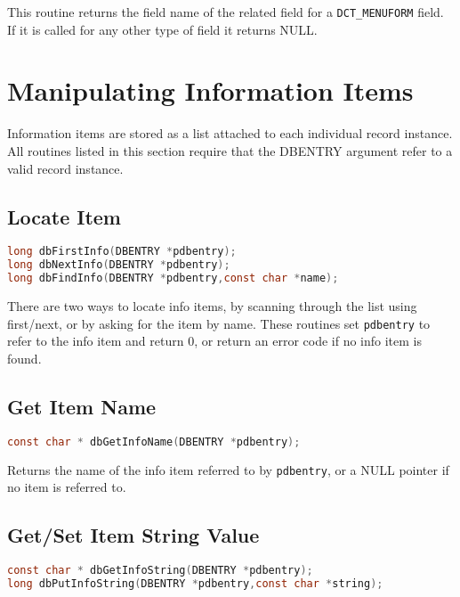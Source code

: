 This routine returns the field name of the related field for a \verb|DCT_MENUFORM| field.
If it is called for any other type of field it returns NULL.

\section{Manipulating Information Items}

Information items are stored as a list attached to each individual record instance. All routines listed in this section require 
that the DBENTRY argument refer to a valid record instance.

\subsection{Locate Item}

\begin{lstlisting}[language=C]
long dbFirstInfo(DBENTRY *pdbentry);
long dbNextInfo(DBENTRY *pdbentry);
long dbFindInfo(DBENTRY *pdbentry,const char *name);
\end{lstlisting}

There are two ways to locate info items, by scanning through the list using first/next, or by asking for the item by name.
These routines set \verb|pdbentry| to refer to the info item and return 0, or return an error code if no info item is found.

\subsection{Get Item Name}

\begin{lstlisting}[language=C]
const char * dbGetInfoName(DBENTRY *pdbentry);
\end{lstlisting}

Returns the name of the info item referred to by \verb|pdbentry|, or a NULL pointer if no item is referred to.

\subsection{Get/Set Item String Value}

\begin{lstlisting}[language=C]
const char * dbGetInfoString(DBENTRY *pdbentry);
long dbPutInfoString(DBENTRY *pdbentry,const char *string);
\end{lstlisting}

